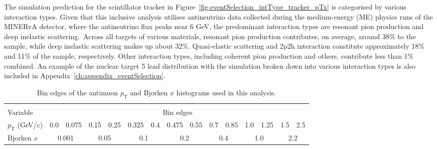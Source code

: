 The simulation prediction for the scintillator tracker in Figure~\ref{fig:eventSelection_intType_tracker_pTx} is categorised by various interaction types. Given that this inclusive analysis utilises antineutrino data collected during the medium-energy (ME) physics runs of the MINERvA detector, where the antineutrino flux peaks near $6$ GeV, the predominant interaction types are resonant pion production and deep inelastic scattering.~Across all targets of various materials, resonant pion production contributes, on average, around 38\% to the sample, while deep inelastic scattering makes up about 32\%. Quasi-elastic scattering and 2p2h interaction constitute approximately 18\% and 11\% of the sample, respectively. Other interaction types, including coherent pion production and others, contribute less than 1\% combined. An example of the nuclear target 5 lead distribution with the simulation broken down into various interaction types is also included in Appendix~\ref{ch:appendix_eventSelection}.

\begin{table}[t!]
    \centering
    \small

    \begin{tabularx}{1\textwidth}{p{} p{} p{} p{} p{} p{} p{} p{} p{} p{} p{} p{} p{} p{} p{}}
    \hline \\ [-1.5 ex]
    Variable & \multicolumn{14}{c}{Bin edges} \\ [0.5ex] %
    \hline
    \hline
    $p_{\text{T}}$ (GeV/$c$) & 0.0 & 0.075 & 0.15 & 0.25 & 0.325 & 0.4 & 0.475 & 0.55 & 0.7 & 0.85 & 1.0 & 1.25 & 1.5 & 2.5 \\
    \hline
    Bjorken $x$ & \multicolumn{2}{c}{0.001}  & \multicolumn{2}{c}{0.05}  & \multicolumn{2}{c}{0.1}  & \multicolumn{2}{c}{0.2}  & \multicolumn{2}{c}{0.4}  & \multicolumn{2}{c}{1.0}  & \multicolumn{2}{c}{2.2}  \\
    \hline
    \end{tabularx}
    \caption{Bin edges of the antimuon $p_{\text{T}}$ and Bjorken $x$ histograms used in this analysis.}
    \label{table:bindEdges}
\end{table}

